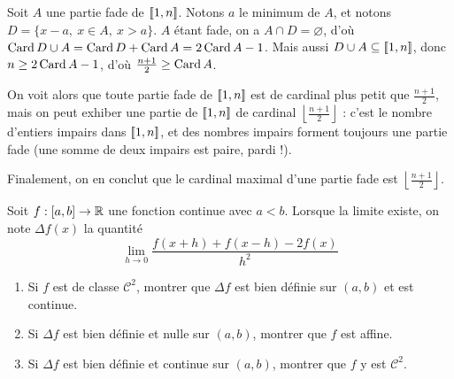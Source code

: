 \begin{solution}

    Soit $A$ une partie fade de $[\![1,n]\!]$. 
    Notons $a$ le minimum de $A$, et notons $D=\lbrace x-a,\ x\in A,\ x>a\rbrace$. 
    $A$ étant fade, on a $A\cap D=\varnothing$, d'où $\operatorname{Card} D\cup A=\operatorname{Card} D+\operatorname{Card} A=2\operatorname{Card} A-1$.
    Mais aussi $D\cup A\subseteq [\![1,n]\!]$, donc $n\geq 2\operatorname{Card} A-1$, d'où $\frac{n+1}2\geq \operatorname{Card} A$. 

    On voit alors que toute partie fade de $[\![1,n]\!]$ est de cardinal plus petit que $\frac{n+1}2$, mais on peut exhiber 
    une partie de $[\![1,n]\!]$ de cardinal $\left\lfloor\frac{n+1}2\right\rfloor$ : c'est le nombre d'entiers impairs dans $[\![1,n]\!]$,
    et des nombres impairs forment toujours une partie fade (une somme de deux impairs est paire, pardi !).

    Finalement, on en conclut que le cardinal maximal d'une partie fade est $\left\lfloor\frac{n+1}2\right\rfloor$.

\end{solution}

\begin{exo}
    \label{misc2}
    Soit $f:[a,b]\to\operatorname{\mathbb R}$ une fonction continue avec $a<b$. 
    Lorsque la limite existe, on note $\Delta f(x)$ la quantité 
    \[
        \lim_{h\to 0}\frac{f(x+h)+f(x-h)-2f(x)}{h^2}
    \]
    \begin{enumerate}
        \item Si $f$ est de classe $\mathcal C^2$, montrer que $\Delta f$ est bien définie sur $(a,b)$ et est continue.
        \item Si $\Delta f$ est bien définie et nulle sur $(a,b)$, montrer que $f$ est affine.
        \item Si $\Delta f$ est bien définie et continue sur $(a,b)$, montrer que $f$ y est $\mathcal C^2$. 
    \end{enumerate}
\end{exo}


